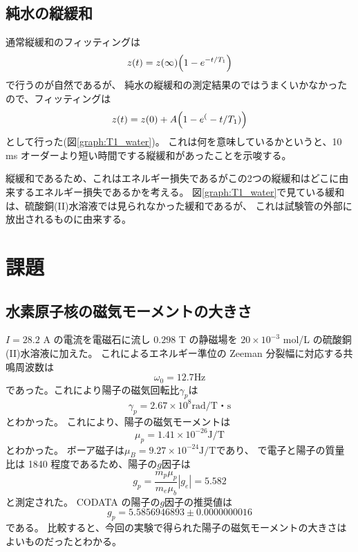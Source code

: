 \documentclass[11pt,dvipdfmx,a4paper]{jsarticle}
\begin{document}
\subsection{純水の縦緩和}
通常縦緩和のフィッティングは
\begin{equation}
	z(t) = z(\infty)\qty(1-e^{-t/T_1})
\end{equation}
で行うのが自然であるが、
純水の縦緩和の測定結果のではうまくいかなかったので、フィッティングは
\begin{equation}
	z(t) = z(0)  + A\qty(1-e^(-t/T_1))
\end{equation}
として行った(図\ref{graph:T1_water})。
これは何を意味しているかというと、10 ms オーダーより短い時間でする縦緩和があったことを示唆する。

縦緩和であるため、これはエネルギー損失であるがこの2つの縦緩和はどこに由来するエネルギー損失であるかを考える。
図\ref{graph:T1_water}で見ている緩和は、硫酸銅(II)水溶液では見られなかった緩和であるが、
これは試験管の外部に放出されるものに由来する。

\section{課題}
\subsection{水素原子核の磁気モーメントの大きさ}
\(I = 28.2\) A の電流を電磁石に流し \(0.298\) T の静磁場を
\(20\times 10^{-3}\) mol/L の硫酸銅(II)水溶液に加えた。
これによるエネルギー準位の Zeeman 分裂幅に対応する共鳴周波数は
\begin{equation}
	\omega_0 = 12.7  \text{Hz}
\end{equation}
であった。これにより陽子の磁気回転比\(\gamma_p\)は
\begin{equation}
	\gamma_p = 2.67 \times 10^8 \text{rad/T・s}
\end{equation}
とわかった。
これにより、陽子の磁気モーメントは
\begin{equation}
	\mu_p = 1.41 \times 10^{-26} \text{J/T}
\end{equation}
とわかった。
ボーア磁子は\(\mu_B = 9.27 \times 10^{-24} \text{J/T}\)であり、
で電子と陽子の質量比は 1840 程度であるため、陽子の\(g\)因子は
\begin{equation}
	g_p = \frac{m_p\mu_p}{m_e\mu_b}|g_e| =5.582
\end{equation}
と測定された。
CODATA の陽子の\(g\)因子の推奨値は
\begin{equation}
	g_p = 5.5856946893 \pm 0.0000000016
\end{equation}
である。
比較すると、今回の実験で得られた陽子の磁気モーメントの大きさはよいものだったとわかる。
\end{document}
